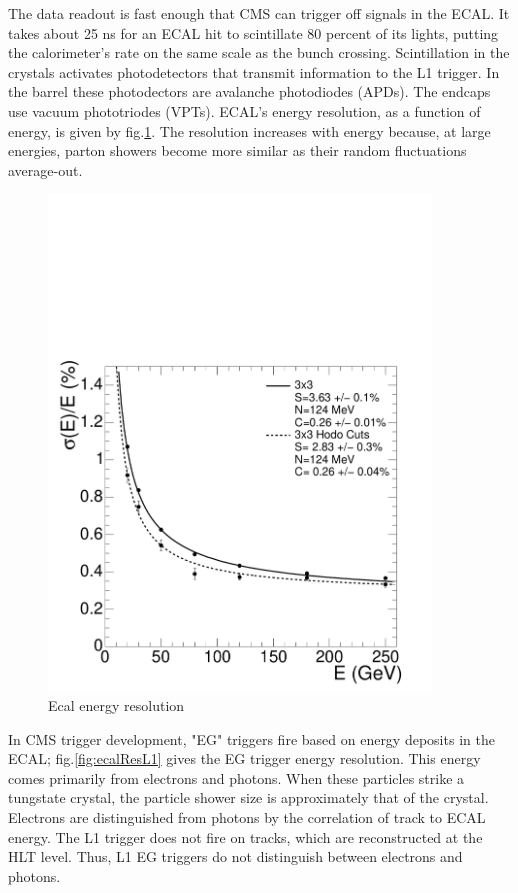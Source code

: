 The data readout is fast enough that CMS can trigger off signals in the ECAL. It takes about 25 ns for an ECAL hit to scintillate 80 percent of its lights, putting the calorimeter's rate on the same scale as the bunch crossing. Scintillation in the crystals activates photodetectors that transmit information to the L1 trigger. In the barrel these photodectors are avalanche photodiodes (APDs). The endcaps use vacuum phototriodes (VPTs). ECAL's energy resolution, as a function of energy, is given by fig.\ref{fig:ecalRes}. The resolution increases with energy because, at large energies, parton showers become more similar as their random fluctuations average-out.

\begin{figure}[h!]
\begin{centering}
\includegraphics[width=4in]{Chapter3/importfigs/Figure_001-007.pdf}
\par\end{centering}
\caption{Ecal energy resolution \label{fig:ecalRes}}
\end{figure}
 
In CMS trigger development, "EG" triggers fire based on energy deposits in the ECAL; fig.\ref{fig:ecalResL1} gives the EG trigger energy resolution. This energy comes primarily from electrons and photons. When these particles strike a tungstate crystal, the particle shower size is approximately that of the crystal. Electrons are distinguished from photons by the correlation of track to ECAL energy. The L1 trigger does not fire on tracks, which are reconstructed at the HLT level. Thus, L1 EG triggers do not distinguish between electrons and photons. 

